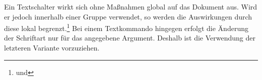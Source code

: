 \documentclass[%
  english,ngerman,%
  headings=optiontoheadandtoc,captions=tableheading,numbers=noenddot,%
  chapterpage,cdfoot,%
]{tudscrman}
\begin{document}
\begin{Declaration}{}
\begin{Declaration}{}
\begin{Declaration}{}
\begin{Declaration}{}
\begin{Declaration}{}
\begin{Declaration}{}
\begin{Declaration}{}
\begin{Declaration}{}
\begin{Declaration}{}
\begin{Declaration}{}
\begin{Declaration}{}
\begin{Declaration}{}
\begin{Declaration}{}
\begin{Declaration}{}
\begin{Declaration}{}
\begin{Declaration}{}
\begin{Declaration}{}
\begin{Declaration}{}
Ein Textschalter wirkt sich ohne Maßnahmen global auf das Dokument aus. Wird er 
jedoch innerhalb einer Gruppe verwendet, so werden die Auswirkungen durch diese 
lokal begrenzt.\footnote{ und } Bei einem 
Textkommando hingegen erfolgt die Änderung der Schriftart nur für das angegebene 
Argument. Deshalb ist die Verwendung der letzteren Variante vorzuziehen.  
\end{Declaration}
\end{Declaration}
\end{Declaration}
\end{Declaration}
\end{Declaration}
\end{Declaration}
\end{Declaration}
\end{Declaration}
\end{Declaration}
\end{Declaration}
\end{Declaration}
\end{Declaration}
\end{Declaration}
\end{Declaration}
\end{Declaration}
\end{Declaration}
\end{Declaration}
\end{Declaration}
\end{document}
